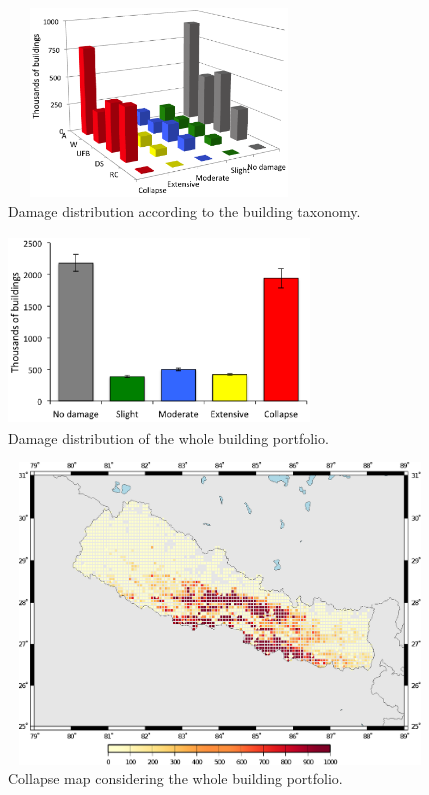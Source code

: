 \begin{figure}[ht]
\centering
\includegraphics[width=8cm,height=5cm]{./figures/risk/TaxonomyDisaggregation.eps}
\caption{Damage distribution according to the building taxonomy.}
\label{fig:TaxDis}
\end{figure} 

\begin{figure}[ht]
\centering
\includegraphics[width=8cm,height=5cm]{./figures/risk/TotalDis.eps}
\caption{Damage distribution of the whole building portfolio.}
\label{fig:TotalDis}
\end{figure} 

\begin{figure}[ht]
\centering
\includegraphics[width=12cm,height=8cm]{./figures/risk/CollapseMap.eps}
\caption{Collapse map considering the whole building portfolio.}
\label{fig:CollapseMap}
\end{figure} 